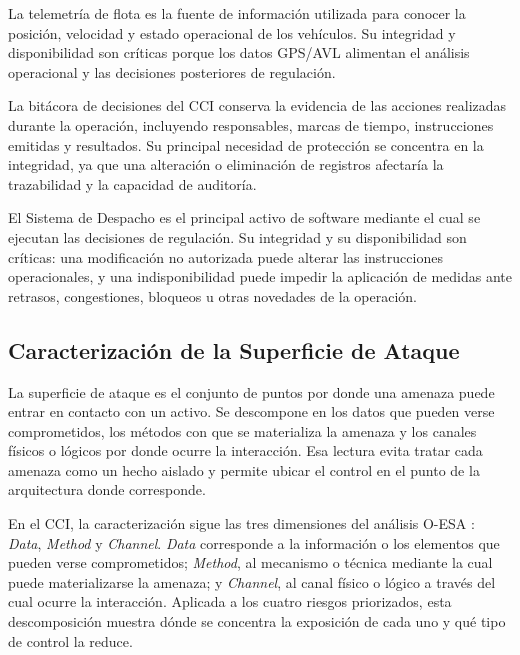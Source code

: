 La telemetría de flota es la fuente de información utilizada para conocer la
posición, velocidad y estado operacional de los vehículos. Su integridad y disponibilidad son
críticas porque los datos GPS/AVL alimentan el análisis operacional y
las decisiones posteriores de regulación.

La bitácora de decisiones del CCI conserva la evidencia de las acciones realizadas
durante la operación, incluyendo responsables, marcas de tiempo, instrucciones emitidas y
resultados. Su principal necesidad de protección se concentra en la integridad, ya que una
alteración o eliminación de registros afectaría la trazabilidad y la capacidad de auditoría.

El Sistema de Despacho es el principal activo de software mediante el cual se ejecutan las decisiones de regulación. Su integridad y su disponibilidad son críticas: una modificación no autorizada puede alterar las instrucciones operacionales, y una indisponibilidad puede impedir la aplicación de medidas ante retrasos, congestiones, bloqueos u otras novedades de la operación.


\subsection{Caracterización de la Superficie de Ataque}

La superficie de ataque es el conjunto de puntos por donde una amenaza puede entrar en contacto con un activo. Se descompone en los datos que pueden verse comprometidos, los métodos con que se materializa la amenaza y los canales físicos o lógicos por donde ocurre la interacción. Esa lectura evita tratar cada amenaza como un hecho aislado y permite ubicar el control en el punto de la arquitectura donde corresponde.

En el CCI, la caracterización sigue las tres dimensiones del análisis O-ESA \parencite{oesa2011,oesaCCI2026}: \textit{Data}, \textit{Method} y \textit{Channel}. \textit{Data} corresponde a la información o los elementos que pueden verse comprometidos; \textit{Method}, al mecanismo o técnica mediante la cual puede materializarse la amenaza; y \textit{Channel}, al canal físico o lógico a través del cual ocurre la interacción. Aplicada a los cuatro riesgos priorizados, esta descomposición muestra dónde se concentra la exposición de cada uno y qué tipo de control la reduce.


